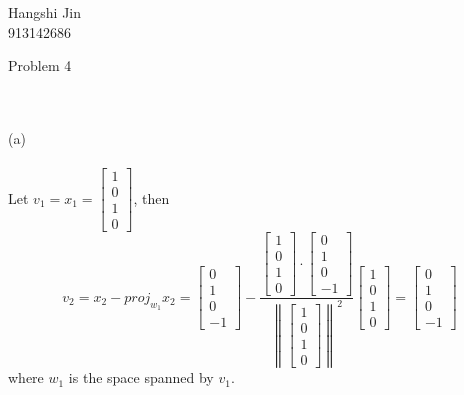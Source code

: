 \documentclass{article}
\begin{document}
\begin{flushright}Hangshi Jin\\913142686\end{flushright}
\begin{large}Problem 4\end{large}
\\\\(a)
\\\\Let $v_1=x_1=\begin{bmatrix}1\\0\\1\\0\end{bmatrix}$, then\begin{equation*}v_2=x_2-proj_{w_1}x_2=\begin{bmatrix}0\\1\\0\\-1\end{bmatrix}-\frac{\begin{bmatrix}1\\0\\1\\0\end{bmatrix}\cdot\begin{bmatrix}0\\1\\0\\-1\end{bmatrix}}{\left\lVert\begin{bmatrix}1\\0\\1\\0\end{bmatrix}\right\rVert^2}\begin{bmatrix}1\\0\\1\\0\end{bmatrix}=\begin{bmatrix}0\\1\\0\\-1\end{bmatrix}\end{equation*}where $w_1$ is the space spanned by $v_1$.
\end{document}
